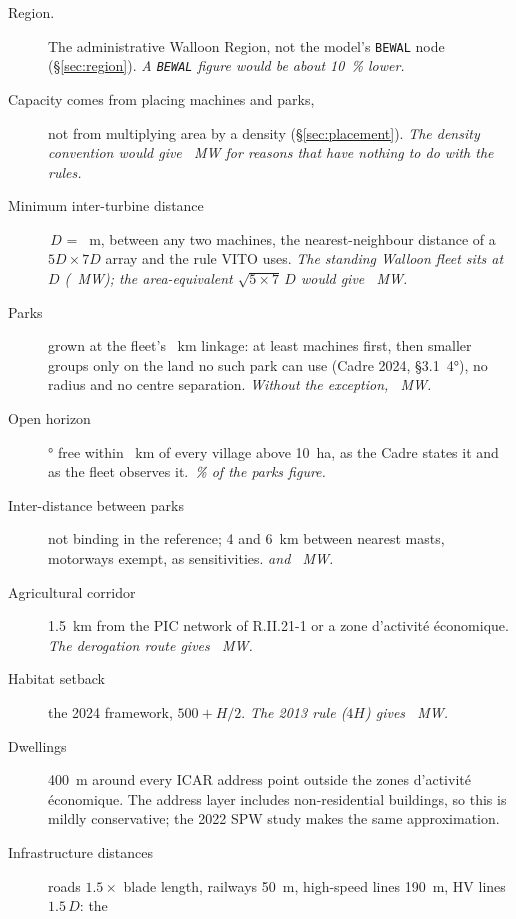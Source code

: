 \documentclass[11pt,a4paper]{article}
\begin{document}
\begin{description}
  \item[Region.] The administrative Walloon Region, not the model's
    \texttt{BEWAL} node (§\ref{sec:region}). \emph{A \texttt{BEWAL} figure would
    be about \SI{10}{\percent} lower.}
  \item[Capacity comes from placing machines and parks,] not from multiplying
    area by a density (§\ref{sec:placement}). \emph{The density convention would
    give \AdminPnom{}~MW for reasons that have nothing to do with the rules.}
  \item[Minimum inter-turbine distance] \PlaceRotorD{}\,$D$ = \PlaceSpacing{}~m,
    between any two machines, the nearest-neighbour distance of a $5D\times7D$
    array and the rule VITO uses. \emph{The standing Walloon fleet sits at
    \SpObsD{}\,$D$ (\SpObsMW{}~MW); the area-equivalent $\sqrt{5\times7}\,D$
    would give \SpIsoMW{}~MW.}
  \item[Parks] grown at the fleet's \PlaceLink{}~km linkage: at least
    \PlaceMinTurbines{} machines first, then smaller groups only on the land no
    such park can use (Cadre 2024, §3.1~4°), no radius and no centre separation.
    \emph{Without the exception, \SensParksFourMW{}~MW.}
  \item[Open horizon] \PlaceAzimuth{}° free within \PlaceHorizonRadius{}~km of
    every village above \SI{10}{\hectare}, as the Cadre states it and as the
    fleet observes it. \emph{\HorizonCostPct{}\,\% of the parks figure.}
  \item[Inter-distance between parks] not binding in the reference; 4 and 6~km
    between nearest masts, motorways exempt, as sensitivities.
    \emph{\IdFourMW{} and \IdSixMW{}~MW.}
  \item[Agricultural corridor] \SI{1.5}{\kilo\metre} from the PIC network of
    R.II.21-1 or a zone d'activité économique. \emph{The derogation route gives
    \SensNoCorridorMW{}~MW.}
  \item[Habitat setback] the 2024 framework, $500 + H/2$. \emph{The 2013 rule
    ($4H$) gives \SensHabitatOldMW{}~MW.}
  \item[Dwellings] \SI{400}{\metre} around every ICAR address point outside the
    zones d'activité économique. The address layer includes non-residential
    buildings, so this is mildly conservative; the 2022 SPW study makes the same
    approximation.
  \item[Infrastructure distances] roads $1.5\times$ blade length, railways
    \SI{50}{\metre}, high-speed lines \SI{190}{\metre}, HV lines $1.5\,D$: the

\end{description}
\end{document}
